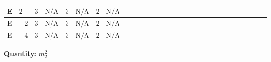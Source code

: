 \documentclass[8pt]{article}
\begin{document}
\begin{landscape}
\begin{longtable}{@{}llcccccc >{\raggedright\arraybackslash}p{0.21\linewidth} >{\raggedright\arraybackslash}p{0.21\linewidth} >{\raggedright\arraybackslash}p{0.21\linewidth}@{}}
\midrule
E & $2$ & $3$ & $\text{N/A}$ & $3$ & $\text{N/A}$ & $2$ & $\text{N/A}$ & --- & --- & \scriptsize\adjustbox{max width=\linewidth}{$\begin{gathered} -12 {g_2}^2 {m_2^2}\end{gathered}$} \\
\midrule
E & $-2$ & $3$ & $\text{N/A}$ & $3$ & $\text{N/A}$ & $2$ & $\text{N/A}$ & --- & --- & \scriptsize\adjustbox{max width=\linewidth}{$\begin{gathered} -12 {g_2}^2 {m_2^2}\end{gathered}$} \\
\midrule
E & $-4$ & $3$ & $\text{N/A}$ & $3$ & $\text{N/A}$ & $2$ & $\text{N/A}$ & --- & --- & \scriptsize\adjustbox{max width=\linewidth}{$\begin{gathered} -12 {g_2}^2 {m_2^2}\end{gathered}$} \\
\midrule
\bottomrule
\end{longtable}
\clearpage
\noindent\textbf{Quantity: }$m_2^2$\par\smallskip

\end{landscape}
\end{document}
